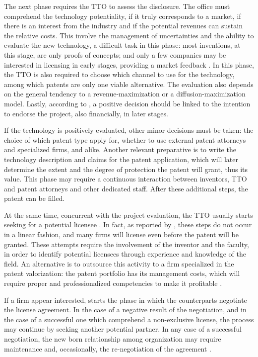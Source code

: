 The next phase requires the TTO to assess the disclosure. The office must comprehend the technology potentiality, if it truly corresponds to a market, if there is an interest from the industry and if the potential revenues can sustain the relative costs. This involve the management of uncertainties and the ability to evaluate the new technology, a difficult task in this phase: most inventions, at this stage, are only proofs of concepts; and only a few companies may be interested in licensing in early stages, providing a market feedback \citep{Jensen2003}. In this phase, the TTO is also required to choose which channel to use for the technology, among which patents are only one viable alternative. The evaluation also depends on the general tendency to a revenue-maximization or a diffusion-maximization model. Lastly, according to \citet{McAdam2005}, a positive decision should be linked to the intention to endorse the project, also financially, in later stages.

If the technology is positively evaluated, other minor decisions must be taken: the choice of which patent type apply for, whether to use external patent attorneys and specialized firms, and alike. Another relevant preparative is to write the technology description and claims for the patent application, which will later determine the extent and the degree of protection the patent will grant, thus its value. This phase may require a continuous interaction between inventors, TTO and patent attorneys and other dedicated staff. After these additional steps, the patent can be filled.

At the same time, concurrent with the project evaluation, the TTO usually starts seeking for a potential licensee \citep{Markman2005}. In fact, as reported by \citet{Siegel2003a}, these steps do not occur in a linear fashion, and many firms will license even before the patent will be granted. These attempts require the involvement of the inventor and the faculty, in order to identify potential licensees through experience and knowledge of the field. An alternative is to outsource this activity to a firm specialized in the patent valorization: the patent portfolio has its management costs, which will require proper and professionalized competencies to make it profitable \citep{Balderi2010}. 

If a firm appear interested, starts the phase in which the counterparts negotiate the license agreement. In the case of a negative result of the negotiation, and in the case of a successful one which comprehend a non-exclusive license, the process may continue by seeking another potential partner. In any case of a successful negotiation, the new born relationship among organization may require maintenance and, occasionally, the re-negotiation of the agreement \citep{Siegel2003a}. 

